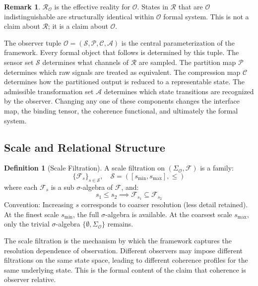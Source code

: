 \documentclass[12pt]{article}
\theoremstyle{definition}
\newtheorem{definition}{Definition}
\newtheorem{remark}{Remark}
\begin{document}
\begin{remark}
$\mathcal{R}_{\mathcal{O}}$ is the effective reality for $\mathcal{O}$. States in $\mathcal{R}$ that are $\mathcal{O}$ indistinguishable are structurally identical within $\mathcal{O}$ formal system. This is not a claim about $\mathcal{R}$; it is a claim about $\mathcal{O}$.
\end{remark}

The observer tuple $\mathcal{O} = (\mathcal{S}, \mathcal{P}, \mathcal{C}, \mathcal{A})$ is the central parameterization of the framework. Every formal object that follows is determined by this tuple. The sensor set $\mathcal{S}$ determines what channels of $\mathcal{R}$ are sampled. The partition map $\mathcal{P}$ determines which raw signals are treated as equivalent. The compression map $\mathcal{C}$ determines how the partitioned output is reduced to a representable state. The admissible transformation set $\mathcal{A}$ determines which state transitions are recognized by the observer. Changing any one of these components changes the interface map, the binding tensor, the coherence functional, and ultimately the formal system.

\subsection{Scale and Relational Structure}

\begin{definition}[Scale Filtration]
A scale filtration on $(\Sigma_{\mathcal{O}}, \mathcal{F})$ is a family:
\begin{equation}
\{\mathcal{F}_s\}_{s \in \mathcal{S}}, \quad \mathcal{S} = ([s_{\min}, s_{\max}], \leq)
\end{equation}
where each $\mathcal{F}_s$ is a sub $\sigma$-algebra of $\mathcal{F}$, and:
\begin{equation}
s_1 \leq s_2 \implies \mathcal{F}_{s_1} \subseteq \mathcal{F}_{s_2}
\end{equation}
Convention: Increasing $s$ corresponds to coarser resolution (less detail retained). At the finest scale $s_{\min}$, the full $\sigma$-algebra is available. At the coarsest scale $s_{\max}$, only the trivial $\sigma$-algebra $\{\emptyset, \Sigma_{\mathcal{O}}\}$ remains.
\end{definition}

The scale filtration is the mechanism by which the framework captures the resolution dependence of observation. Different observers may impose different filtrations on the same state space, leading to different coherence profiles for the same underlying state. This is the formal content of the claim that coherence is observer relative.
\end{document}
